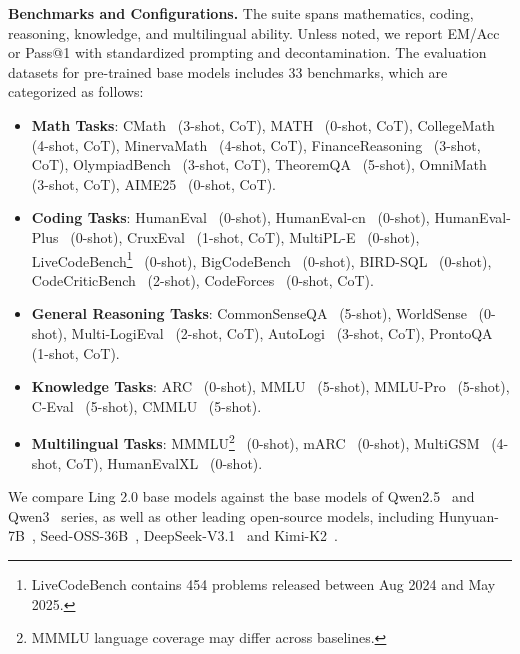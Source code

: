 \documentclass[table]{gtech}
\theoremstyle{definition}
\begin{document}
{\bfseries Benchmarks and Configurations.} 
The suite spans mathematics, coding, reasoning, knowledge, and multilingual ability. Unless noted, we report EM/Acc or Pass@1 with standardized prompting and decontamination. The evaluation datasets for pre-trained base models includes 33 benchmarks, which are categorized as follows:
\begin{itemize}
    \item \textbf{Math Tasks}: CMath~\citep{cmath} (3-shot, CoT), 
    MATH~\citep{math} (0-shot, CoT), 
    CollegeMath~\citep{college-math} (4-shot, CoT), 
    MinervaMath~\citep{Minerva} (4-shot, CoT), 
    FinanceReasoning~\citep{finance-reasoning} (3-shot, CoT), 
    OlympiadBench~\citep{olympiadbench} (3-shot, CoT), 
    TheoremQA~\citep{theoremqa} (5-shot), 
    OmniMath~\citep{omni-math} (3-shot, CoT), 
    AIME25~\citep{aime25} (0-shot, CoT).

    \item \textbf{Coding Tasks}: HumanEval~\citep{humaneval} (0-shot), 
    HumanEval-cn~\citep{humaneval_cn} (0-shot), 
    HumanEval-Plus~\citep{mbpp+} (0-shot), 
    CruxEval~\citep{cruxeval} (1-shot, CoT), 
    MultiPL-E~\citep{multipl-e} (0-shot), 
    LiveCodeBench\footnote{LiveCodeBench contains 454 problems released between Aug 2024 and May 2025. }~\citep{livecodebench} (0-shot), 
    BigCodeBench~\citep{bigcodebench} (0-shot), 
    BIRD-SQL~\citep{birdsql} (0-shot), 
    CodeCriticBench~\citep{codecriticbench} (2-shot), 
    CodeForces~\citep{codeforces} (0-shot, CoT).

    \item \textbf{General Reasoning Tasks}: 
    CommonSenseQA~\citep{talmor2018commonsenseqa} (5-shot), 
    WorldSense~\citep{worldsense} (0-shot), 
    Multi-LogiEval~\citep{Multilogieval} (2-shot, CoT), 
    AutoLogi~\citep{autologi} (3-shot, CoT), 
    ProntoQA~\citep{PrOntoQA} (1-shot, CoT). 

    \item \textbf{Knowledge Tasks}: ARC~\citep{arc} (0-shot), 
    MMLU~\citep{mmlu} (5-shot), 
    MMLU-Pro~\citep{mmlu-pro} (5-shot), 
    C-Eval~\citep{ceval} (5-shot), 
    CMMLU~\citep{cmmlu} (5-shot).

    \item \textbf{Multilingual Tasks}: 
    MMMLU\footnote{MMMLU language coverage may differ across baselines.}~\citep{mmmlu} (0-shot), 
    mARC~\citep{marc} (0-shot), 
    MultiGSM~\citep{mgsm} (4-shot, CoT), 
    HumanEvalXL~\citep{humanevalxl} (0-shot).
\end{itemize}
We compare Ling 2.0 base models against the base models of Qwen2.5~\citep{qwen2.5} and Qwen3~\citep{qwen3} series, as well as other leading open-source models, including Hunyuan-7B~\citep{hunyuan-7b}, Seed-OSS-36B~\citep{seed2025seed-oss}, DeepSeek-V3.1~\citep{deepseekai2024deepseekv3technicalreport} and Kimi-K2~\citep{kimiK2}.
\end{document}
